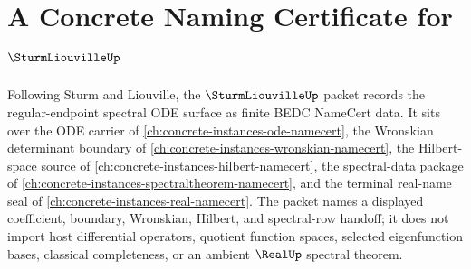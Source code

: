 \chapter{A Concrete Naming Certificate for $\SturmLiouvilleUp$}
\label{ch:concrete-instances-sturm-liouville-namecert}

Following Sturm and Liouville, the $\SturmLiouvilleUp$ packet records the regular-endpoint spectral ODE surface as finite BEDC NameCert data. It sits over the ODE carrier of \autoref{ch:concrete-instances-ode-namecert}, the Wronskian determinant boundary of \autoref{ch:concrete-instances-wronskian-namecert}, the Hilbert-space source of \autoref{ch:concrete-instances-hilbert-namecert}, the spectral-data package of \autoref{ch:concrete-instances-spectraltheorem-namecert}, and the terminal real-name seal of \autoref{ch:concrete-instances-real-namecert}. The packet names a displayed coefficient, boundary, Wronskian, Hilbert, and spectral-row handoff; it does not import host differential operators, quotient function spaces, selected eigenfunction bases, classical completeness, or an ambient $\RealUp$ spectral theorem.

